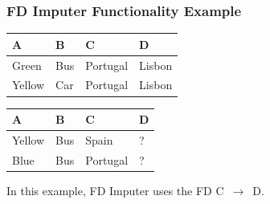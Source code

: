 \documentclass{beamer}
\begin{document}
\begin{frame}
    \frametitle{FD Imputer Functionality Example}
\begin{table}[ht]
    \begin{subtable}[c]{0.9\textwidth}
        \centering
        \begin{tabular}{llll}
            \textsc{A} & \textsc{B} & \textsc{C} & \textsc{D}  \\
        \toprule
        \toprule
            Green & Bus & Portugal & Lisbon \\
            Yellow & Car & Portugal & Lisbon \\
        \bottomrule
        \bottomrule
        \end{tabular}
    \end{subtable}
    \newline
    \vspace*{0.3 cm}
    \newline
\begin{subtable}[c]{0.9\textwidth}
        \centering
        \begin{tabular}{llll}
        \textsc{A} & \textsc{B} & \textsc{C} & \textsc{D} \\
        \toprule
        \toprule
        Yellow & Bus & Spain & ? \\
        Blue & Bus & Portugal & ? \\
        \bottomrule
        \bottomrule
        \end{tabular}
    \end{subtable}
\end{table}
In this example, FD Imputer uses the FD \textsc{C}~$\rightarrow$~\textsc{D}.
\end{frame}
\end{document}
